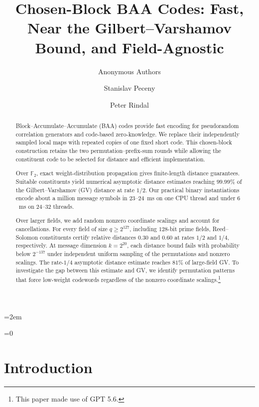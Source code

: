 \documentclass[runningheads,envcountsame,envcountsect]{llncs}
\title{Chosen-Block BAA Codes: Fast, Near the Gilbert--Varshamov Bound, and Field-Agnostic}
\author{Anonymous Authors}
\institute{}
\author{Stanislav Peceny\inst{1} \and Peter Rindal\inst{2}}
\institute{Stealth Software Technologies, Inc. \and Category Labs}
\providecommand{\submission}{0}
\newcommand{\F}{\mathbb F}
\begin{document}
\raggedbottom
\emergencystretch=2em
\maketitle

\begin{abstract}
Block--Accumulate--Accumulate (BAA) codes provide fast encoding for
pseudorandom correlation generators and code-based zero-knowledge.  We
replace their independently sampled local maps with repeated copies of one
fixed short code.  This chosen-block construction retains the two
permutation--prefix-sum rounds while allowing the constituent code to be
selected for distance and efficient implementation.

\qquad Over $\F_2$, exact weight-distribution propagation gives finite-length
distance guarantees.  Suitable constituents yield numerical asymptotic
distance estimates reaching $99.99\%$ of the Gilbert--Varshamov (GV) distance
at rate $1/2$.  Our practical binary instantiations encode about a million
message symbols in $23$--$24$~ms on one CPU thread and under $6$~ms on
$24$--$32$ threads.

\qquad Over larger fields, we add random nonzero coordinate scalings and
account for cancellations.
For every field of size $q\ge2^{127}$, including $128$-bit prime fields,
Reed--Solomon constituents certify relative distances $0.30$ and $0.60$ at
rates $1/2$ and $1/4$, respectively.  At message dimension $k=2^{20}$,
each distance bound fails with probability below $2^{-137}$ under independent
uniform sampling of the permutations and nonzero scalings.
The rate-$1/4$ asymptotic distance estimate reaches $81\%$ of large-field GV.
To investigate the gap between this estimate and GV, we identify permutation
patterns that force low-weight codewords regardless of the nonzero coordinate
scalings.\footnote{This paper made use of GPT 5.6.
}
\end{abstract}

\ifnum\submission=0
  \begingroup
    \makeatletter
    \setcounter{tocdepth}{1}
    \let\l@title\@gobbletwo
    \let\l@author\@gobbletwo
    \tableofcontents
    \makeatother
  \endgroup
  \clearpage
\fi

\section{Introduction}
\end{document}
